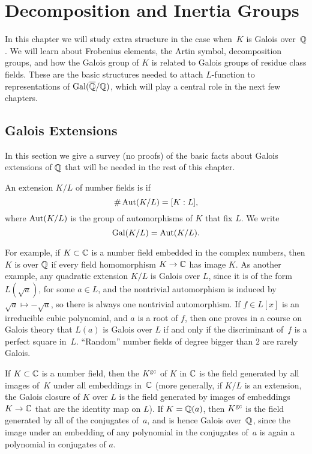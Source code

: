 \chapter{Decomposition and Inertia Groups}
In this chapter we will study extra structure in the case when~$K$
is Galois over~$\mathbb{Q}$.   We will learn about Frobenius elements,
the Artin symbol, decomposition groups, and how the Galois group of
$K$ is related to Galois groups of residue class fields.  These are
the basic structures needed to attach $L$-function to representations of
$\operatorname{Gal}(\overline{\mathbb{Q}}/\mathbb{Q})$, which will play a central role in the next few
chapters.


\section{Galois Extensions}
In this section we give a survey (no proofs) of the basic facts about
Galois extensions of $\mathbb{Q}$ that will be needed in the rest of this
chapter.
\begin{definition}[Galois]
  An extension $K/L$ of number fields is  if $$\#\operatorname{Aut}(K/L)
  = [K:L],$$ where $\operatorname{Aut}(K/L)$ is the group of automorphisms of $K$
  that fix $L$.  We write $$\operatorname{Gal}(K/L) = \operatorname{Aut}(K/L).$$
\end{definition}
For example, if $K\subset \mathbb{C}$ is a number field embedded in the complex numbers,
then $K$ is  over $\mathbb{Q}$ if
every field homomorphism $K\to \mathbb{C}$ has image $K$.
As another example, any quadratic extension
$K/L$ is Galois over $L$, since it is of the form $L(\sqrt{a})$, for some $a\in
L$, and the nontrivial automorphism is induced by $\sqrt{a}\mapsto
-\sqrt{a}$, so there is always one nontrivial automorphism.  If $f\in
L[x]$ is an irreducible cubic polynomial, and $a$ is a root of $f$,
then one proves in a course on Galois theory that $L(a)$ is Galois
over $L$ if and only if the discriminant of~$f$ is a perfect square
in~$L$.  ``Random'' number fields of degree bigger than $2$ are rarely
Galois.


If $K\subset \mathbb{C}$ is a number field, then the  $K^{\operatorname{gc}}$
of $K$ in $\mathbb{C}$ is the field generated by all images of~$K$ under all
embeddings in~$\mathbb{C}$ (more generally, if $K/L$ is an extension, the
Galois closure of $K$ over $L$ is the field generated by images of
embeddings $K\to \mathbb{C}$ that are the identity map on $L$).  If $K=\mathbb{Q}(a)$,
then $K^{\operatorname{gc}}$ is the field generated by all of the conjugates of~$a$, and is
hence Galois over~$\mathbb{Q}$, since the image under an embedding of any
polynomial in the conjugates of~$a$ is again a polynomial in
conjugates of $a$.


